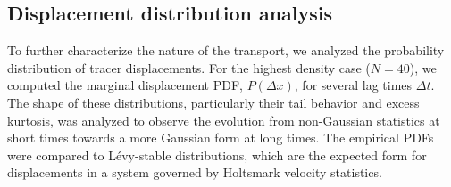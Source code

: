 \documentclass[]{article}
\begin{document}
\subsection{Displacement distribution analysis}
To further characterize the nature of the transport, we analyzed the probability distribution of tracer displacements. For the highest density case ($N=40$), we computed the marginal displacement PDF, $P(\Delta x)$, for several lag times $\Delta t$. The shape of these distributions, particularly their tail behavior and excess kurtosis, was analyzed to observe the evolution from non-Gaussian statistics at short times towards a more Gaussian form at long times. The empirical PDFs were compared to L\'evy-stable distributions, which are the expected form for displacements in a system governed by Holtsmark velocity statistics.
\end{document}
